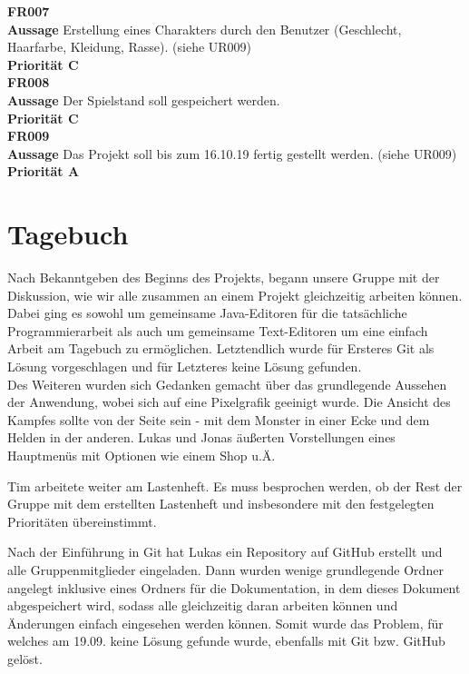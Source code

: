 \textbf{FR007} \\
\textbf{Aussage} Erstellung eines Charakters durch den Benutzer (Geschlecht, Haarfarbe, Kleidung, Rasse). (siehe UR009) \\
\textbf{Priorität C} \\

\textbf{FR008} \\
\textbf{Aussage} Der Spielstand soll gespeichert werden. \\
\textbf{Priorität C} \\

\textbf{FR009} \\
\textbf{Aussage} Das Projekt soll bis zum 16.10.19 fertig gestellt werden. (siehe UR009) \\
\textbf{Priorität A} \\

\newpage

\section{Tagebuch}
\label{Tagebuch}


Nach Bekanntgeben des Beginns des Projekts, begann unsere Gruppe mit der Diskussion, wie wir alle zusammen an einem Projekt gleichzeitig arbeiten können. Dabei ging es sowohl um gemeinsame Java-Editoren für die tatsächliche Programmierarbeit als auch um gemeinsame Text-Editoren um eine einfach Arbeit am Tagebuch zu ermöglichen. Letztendlich wurde für Ersteres Git als Lösung vorgeschlagen und für Letzteres keine Lösung gefunden. \\
Des Weiteren wurden sich Gedanken gemacht über das grundlegende Aussehen der Anwendung, wobei sich auf eine \glqq{}Pixelgrafik\grqq{} geeinigt wurde. Die Ansicht des Kampfes sollte von der Seite sein - mit dem Monster in einer Ecke und dem Helden in der anderen. Lukas und Jonas äußerten Vorstellungen eines Hauptmenüs mit Optionen wie einem Shop u.Ä. \\


Tim arbeitete weiter am Lastenheft. Es muss besprochen werden, ob der Rest der Gruppe mit dem erstellten Lastenheft und insbesondere mit den festgelegten Prioritäten übereinstimmt. \\


Nach der Einführung in Git hat Lukas ein Repository auf GitHub erstellt und alle Gruppenmitglieder eingeladen. Dann wurden wenige grundlegende Ordner angelegt inklusive eines Ordners für die Dokumentation, in dem dieses Dokument abgespeichert wird, sodass alle \glqq{}gleichzeitig\grqq{} daran arbeiten können und Änderungen einfach eingesehen werden können. Somit wurde das Problem, für welches am 19.09. keine Lösung gefunde wurde, ebenfalls mit Git bzw. GitHub gelöst. \\

